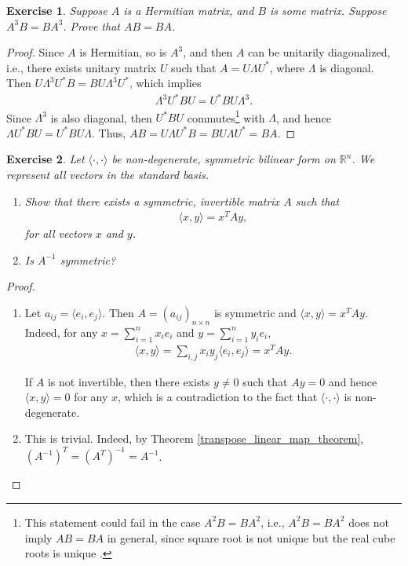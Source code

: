 \documentclass[11pt]{book}
\newtheorem{exercise}{Exercise}[section]
\theoremstyle{definition}
\numberwithin{equation}{chapter}
\begin{document}
\medskip

\begin{exercise}
Suppose $A$ is a Hermitian matrix, and $B$ is some matrix. Suppose $A^3B = BA^3$. Prove that $AB = BA$.
\end{exercise}
\begin{proof}
Since $A$ is Hermitian, so is $A^3$, and then $A$ can be unitarily diagonalized, i.e., there exists unitary matrix $U$ such that $A = U \Lambda U^*$, where $\Lambda$ is diagonal. Then $U \Lambda^3 U^*B = B U \Lambda^3 U^*$, which implies
\begin{align*}
    \Lambda^3 U^*B U = U^* B U \Lambda^3.
\end{align*}
Since $\Lambda^3$ is also diagonal, then $U^*B U$ commutes\footnote{This statement could fail in the case $A^2B = BA^2$, i.e., $A^2 B = B A^2$ does not imply $AB = BA$ in general, since square root is not unique but the real cube roots is unique {\rm \cite{41}}.} with $\Lambda$, and hence $\Lambda U^*B U = U^* B U \Lambda$. Thus, $AB = U \Lambda U^*B = B U \Lambda U^* = BA$.
\end{proof}

\medskip

\begin{exercise}
Let $\big\langle \cdot, \cdot\big\rangle$ be non-degenerate, symmetric bilinear form on $\mathbb{R}^n$. We represent all vectors in the standard basis.
\begin{enumerate}[label=(\alph*)]
    \item Show that there exists a symmetric, invertible matrix $A$ such that 
    \begin{align*}
        \big\langle x, y\big\rangle = x^T Ay,
    \end{align*}
    for all vectors $x$ and $y$.
    
    \item Is $A^{-1}$ symmetric?
\end{enumerate}
\end{exercise}
\begin{proof}
~\begin{enumerate}[label=(\alph*)]
    \item Let $a_{ij} = \big\langle e_i, e_j\big\rangle$. Then $A = \left(a_{ij}\right)_{n \times n}$ is symmetric and $\big\langle x, y\big\rangle = x^T Ay$. Indeed, for any $x = \sum^n_{i=1} x_i e_i$ and $y = \sum^n_{i=1} y_i e_i$,
    \begin{align*}
        \big\langle x, y\big\rangle = \sum_{i,j} x_i y_j \big\langle e_i, e_j\big\rangle = x^T Ay.
    \end{align*}
    
    If $A$ is not invertible, then there exists $y \neq 0$ such that $Ay = 0$ and hence $\big\langle x, y\big\rangle = 0$ for any $x$, which is a contradiction to the fact that $\big\langle \cdot, \cdot\big\rangle$ is non-degenerate.
    
    \item This is trivial. Indeed, by Theorem \ref{transpose_linear_map_theorem}, $\left(A^{-1}\right)^T = \left(A^T\right)^{-1} = A^{-1}$.
\end{enumerate}
\end{proof}
\end{document}
